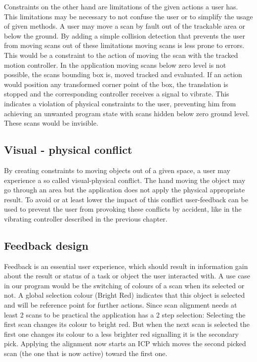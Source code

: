 \documentclass[hyperref,english,bachelorofscience,bibnum]{cgvpub}
\begin{document}
Constraints on the other hand are limitations of the given actions a user has. This limitations may be necessary to not confuse the user or to simplify the usage of given methods. A user may move a scan by fault out of the trackable area or below the ground. By adding a simple collision detection that prevents the user from moving scans out of these limitations moving scans is less prone to errors. This would be a constraint to the action of moving the scan with the tracked motion controller. In the application moving scans below zero level is not possible, the scans bounding box is, moved tracked and evaluated. If an action would position any transformed corner point of the box, the translation is stopped and the corresponding controller receives a signal to vibrate. This indicates a violation of physical constraints to the user, preventing him from achieving an unwanted program state with scans hidden below zero ground level. These scans would be invisible.

\subsection{Visual - physical conflict}

By creating constraints to moving objects out of a given space, a user may experience a so called visual-physical conflict. The hand moving the object may go through an area but the application does not apply the physical appropriate result\cite{Jerald2015}.
To avoid or at least lower the impact of this conflict user-feedback can be used to prevent the user from provoking these conflicts by accident, like in the vibrating controller described in the previous chapter.

\subsection{Feedback design}

Feedback is an essential user experience, which should result in information gain about the result or status of a task or object the user interacted with\cite{Jerald2015}.
A use case in our program would be the switching of colours of a scan when its selected or not. A global selection colour (Bright Red) indicates that this object is selected and will be reference point for further actions. Since scan alignment needs at least 2 scans to be practical the application has a 2 step selection:
Selecting the first scan changes its colour to bright red. But when the next scan is selected the first one changes its colour to a less brighter red signalling it is the secondary pick. Applying the alignment now starts an ICP which moves the second picked scan (the one that is now active) toward the first one.
\end{document}
